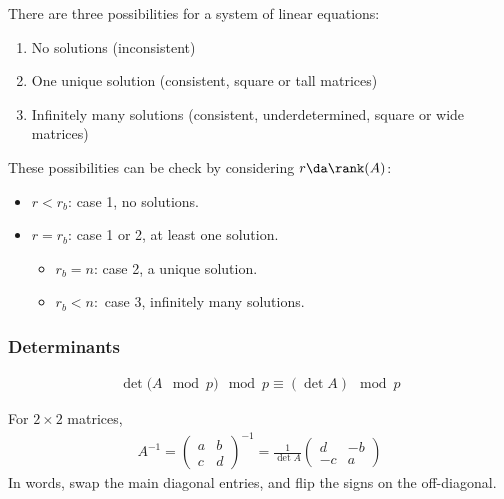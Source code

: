 \begin{proposition}

There are three possibilities for a system of linear equations:

\begin{enumerate}
\def\labelenumi{\arabic{enumi}.}
\tightlist
\item
  No solutions (inconsistent)
\item
  One unique solution (consistent, square or tall matrices)
\item
  Infinitely many solutions (consistent, underdetermined, square or wide
  matrices)
\end{enumerate}

These possibilities can be check by considering \(r\da \rank(A)\):

\begin{itemize}
\tightlist
\item
  \(r < r_b\): case 1, no solutions.
\item
  \(r = r_b\): case 1 or 2, at least one solution.

  \begin{itemize}
  \tightlist
  \item
    \(r_b = n\): case 2, a unique solution.
  \item
    \(r_b < n:\) case 3, infinitely many solutions.
  \end{itemize}
\end{itemize}

\end{proposition}

\hypertarget{determinants}{%
\subsubsection{Determinants}\label{determinants}}

\begin{proposition}[?]

\begin{align*}
\det{(A \mod p}) \mod p \equiv (\det{A}) \mod p
\end{align*}

\end{proposition}

\begin{proposition}

For \(2\times 2\) matrices,
\begin{align*}
A^{-1} = \left( \begin{array}{cc} a & b \\ c & d \end{array}\right)^{-1} = \frac{1}{\det{A}}\left( \begin{array}{cc} d & -b \\ -c & a \end{array}\right)
\end{align*} In words, swap the main diagonal entries, and flip the
signs on the off-diagonal.

\end{proposition}

